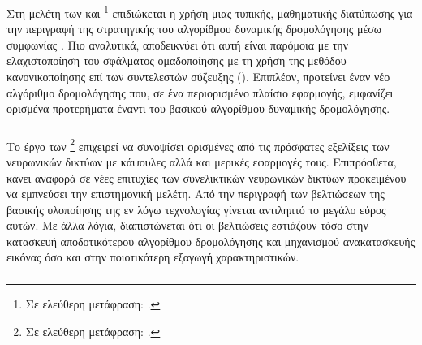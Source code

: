 \subsubsection{}

Στη μελέτη των  και  \footnote{Σε ελεύθερη μετάφραση: .} \cite{wang2018optimization} επιδιώκεται η χρήση μιας τυπικής, μαθηματικής διατύπωσης για την περιγραφή της στρατηγικής του αλγορίθμου δυναμικής δρομολόγησης μέσω συμφωνίας \cite{sabour2017dynamic}. Πιο αναλυτικά, αποδεικνύει ότι αυτή είναι παρόμοια με την ελαχιστοποίηση του σφάλματος ομαδοποίησης με τη χρήση της μεθόδου κανονικοποίησης  επί των συντελεστών σύζευξης (). Επιπλέον, προτείνει έναν νέο αλγόριθμο δρομολόγησης που, σε ένα περιορισμένο πλαίσιο εφαρμογής, εμφανίζει ορισμένα προτερήματα έναντι του βασικού αλγορίθμου δυναμικής δρομολόγησης.


\subsubsection{}

Το έργο των  \footnote{Σε ελεύθερη μετάφραση: .} \cite{pande2018analysis} επιχειρεί να συνοψίσει ορισμένες από τις πρόσφατες εξελίξεις των νευρωνικών δικτύων με κάψουλες αλλά και μερικές εφαρμογές τους. Επιπρόσθετα, κάνει αναφορά σε νέες επιτυχίες των συνελικτικών νευρωνικών δικτύων προκειμένου να εμπνεύσει την επιστημονική μελέτη. Από την περιγραφή των βελτιώσεων της βασικής υλοποίησης της εν λόγω τεχνολογίας γίνεται αντιληπτό το μεγάλο εύρος αυτών. Με άλλα λόγια, διαπιστώνεται ότι οι βελτιώσεις εστιάζουν τόσο στην κατασκευή αποδοτικότερου αλγορίθμου δρομολόγησης και μηχανισμού ανακατασκευής εικόνας όσο και στην ποιοτικότερη εξαγωγή χαρακτηριστικών. 


\subsubsection{}

